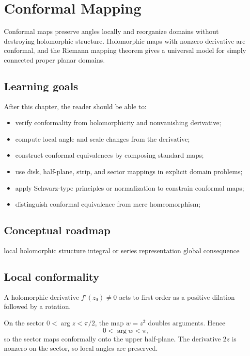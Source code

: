 \chapter{Conformal Mapping}
\label{ch:iv17}

Conformal maps preserve angles locally and reorganize domains without destroying holomorphic structure. Holomorphic maps with nonzero derivative are conformal, and the Riemann mapping theorem gives a universal model for simply connected proper planar domains.

\section*{Learning goals}
After this chapter, the reader should be able to:
\begin{itemize}
\item verify conformality from holomorphicity and nonvanishing derivative;
\item compute local angle and scale changes from the derivative;
\item construct conformal equivalences by composing standard maps;
\item use disk, half-plane, strip, and sector mappings in explicit domain problems;
\item apply Schwarz-type principles or normalization to constrain conformal maps;
\item distinguish conformal equivalence from mere homeomorphism;
\end{itemize}
\section*{Conceptual roadmap}
\volroadmap
  {local holomorphic structure}
  {integral or series representation}
  {global consequence}

\section{Local conformality}
A holomorphic derivative $f'(z_0)\ne0$ acts to first order as a positive dilation followed by a rotation.

\begin{example}\label{ex:iv17-expand-01}
On the sector \(0<\arg z<\pi/2\), the map \(w=z^2\) doubles arguments. Hence
\[
0<\arg w<\pi,
\]
so the sector maps conformally onto the upper half-plane. The derivative \(2z\) is nonzero on the sector, so local angles are preserved.
\end{example}
